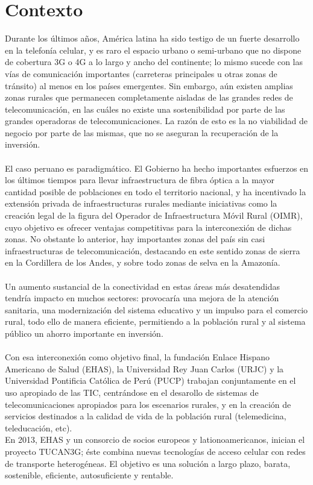 \section{Contexto}
	Durante los últimos años, América latina ha sido testigo de un fuerte desarrollo en la telefonía celular, y es raro el espacio urbano o semi-urbano que no dispone de cobertura 3G o 4G a lo largo y ancho del continente; lo mismo sucede con las vías de comunicación importantes (carreteras principales u otras zonas de tránsito) al menos en los países emergentes. Sin embargo, aún existen amplias zonas rurales que permanecen completamente aisladas de las grandes redes de telecomunicación, en las cuáles no existe una sostenibilidad por parte de las grandes operadoras de telecomunicaciones. La razón de esto es la no viabilidad de negocio por parte de las mismas, que no se aseguran la recuperación de la inversión. \\\\

El caso peruano es paradigmático. El Gobierno ha hecho importantes esfuerzos en los últimos tiempos para llevar infraestructura de fibra óptica a la mayor cantidad posible de poblaciones en todo el territorio nacional, y ha incentivado la extensión privada de infraestructuras rurales mediante iniciativas como la creación legal de la figura del Operador de Infraestructura Móvil Rural (OIMR), cuyo objetivo es ofrecer ventajas competitivas para la interconexión de dichas zonas. No obstante lo anterior, hay importantes zonas del país sin casi infraestructuras de telecomunicación, destacando en este sentido zonas de sierra en la Cordillera de los Andes, y sobre todo zonas de selva en la Amazonía.\\\\
	
	Un aumento sustancial de la conectividad en estas áreas más desatendidas tendría impacto en muchos sectores: provocaría una mejora de la atención sanitaria, una modernización del sistema educativo y un impulso para el comercio rural, todo ello de manera eficiente, permitiendo a la población rural y al sistema público un ahorro importante en inversión.\\\\
	
	Con esa interconexión como objetivo final, la fundación Enlace Hispano Americano de Salud (EHAS), la Universidad Rey Juan Carlos (URJC) y la Universidad Pontificia Católica de Perú (PUCP) trabajan conjuntamente en el uso apropiado de las TIC, centrándose en el desarollo de sistemas de telecomunicaciones apropiados para los escenarios rurales, y en la creación de servicios destinados a la calidad de vida de la población rural (telemedicina, teleducación, etc).\\
	En 2013, EHAS y un consorcio de socios europeos y lationoamericanos, inician el proyecto TUCAN3G; éste combina nuevas tecnologías de acceso celular con redes de transporte heterogéneas. El objetivo es una solución a largo plazo, barata, sostenible, eficiente, autosuficiente y rentable.\\\\
	
